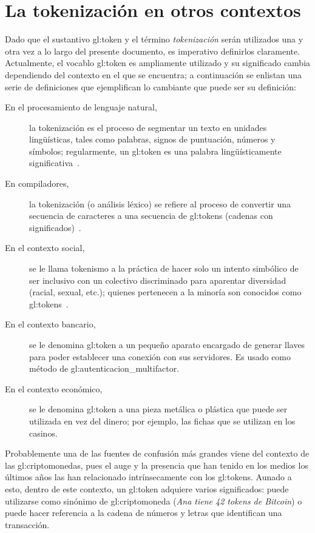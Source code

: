 %
%
%

\section{La tokenización en otros contextos}

Dado que el sustantivo \gls{gl:token} y el término \textit{tokenización} serán
utilizados una y otra vez a lo largo del presente documento, es imperativo
definirlos claramente. Actualmente, el vocablo \gls{gl:token} es ampliamente
utilizado y su significado cambia dependiendo del contexto en el que se
encuentra; a continuación se enlistan una serie de definiciones que
ejemplifican lo cambiante que puede ser su definición:
\begin{description}
  \item [En el procesamiento de lenguaje natural,] la tokenización es el proceso
    de segmentar un texto en unidades lingüísticas, tales como palabras, signos
    de puntuación, números y símbolos; regularmente, un \gls{gl:token} es una
    palabra lingüísticamente significativa~\cite{miscon_nlp}.
  \item [En compiladores,] la tokenización (o análisis léxico) se refiere al
    proceso de convertir una secuencia de caracteres a una secuencia de
    \glspl{gl:token} (cadenas con significados)~\cite{miscon_comp}.
  \item [En el contexto social,] se le llama tokenismo a la práctica de hacer
    solo un intento simbólico de ser inclusivo con un colectivo discriminado
    para aparentar diversidad (racial, sexual, etc.); quienes pertenecen a la
    minoría son conocidos como \glspl{gl:token}~\cite{miscon_soc}.
  \item [En el contexto bancario,] se le denomina \gls{gl:token} a un pequeño
    aparato encargado de generar llaves para poder establecer una conexión con
    sus servidores. Es usado como método de \gls{gl:autenticacion_multifactor}.
  \item [En el contexto económico,] se le denomina \gls{gl:token} a una pieza
    metálica o plástica que puede ser utilizada en vez del dinero; por ejemplo,
    las fichas que se utilizan en los casinos.
\end{description}

Probablemente una de las fuentes de confusión más grandes viene del contexto
de las \glspl{gl:criptomoneda}, pues el auge y la presencia que han tenido en
los medios los últimos años las han relacionado intrínsecamente con los
\glspl{gl:token}. Aunado a esto, dentro de este contexto, un \gls{gl:token}
adquiere varios significados: puede utilizarse como sinónimo de
\gls{gl:criptomoneda} (\textit{Ana tiene 42 tokens de Bitcoin}) o puede hacer
referencia a la cadena de números y letras que identifican una transacción.

